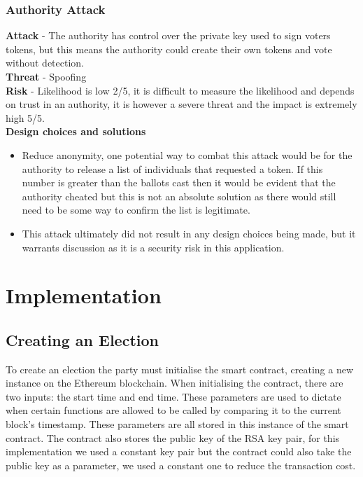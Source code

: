 \documentclass{entcs}
\begin{document}
\subsubsection{Authority Attack} \label{sec: Authority Attack}
\textbf{Attack} - The authority has control over the private key used to sign voters tokens, but this means the authority could create their own tokens and vote without detection. \\
\textbf{Threat} - Spoofing \\
\textbf{Risk} - Likelihood is low 2/5, it is difficult to measure the likelihood and depends on trust in an authority, it is however a severe threat and the impact is extremely high 5/5.\\
\textbf{Design choices and solutions}
\begin{itemize}
    \item Reduce anonymity, one potential way to combat this attack would be for the authority to release a list of individuals that requested a token. If this number is greater than the ballots cast then it would be evident that the authority cheated but this is not an absolute solution as there would still need to be some way to confirm the list is legitimate.
    \item This attack ultimately did not result in any design choices being made, but it warrants discussion as it is a security risk in this application.
\end{itemize}


\section{Implementation} \label{sec: implementation}

\subsection{Creating an Election}
To create an election the party must initialise the smart contract, creating a new instance on the Ethereum blockchain. When initialising the contract, there are two inputs: the start time and end time. These parameters are used to dictate when certain functions are allowed to be called by comparing it to the current block's timestamp. These parameters are all stored in this instance of the smart contract. The contract also stores the public key of the RSA key pair, for this implementation we used a constant key pair but the contract could also take the public key as a parameter, we used a constant one to reduce the transaction cost.
\end{document}
